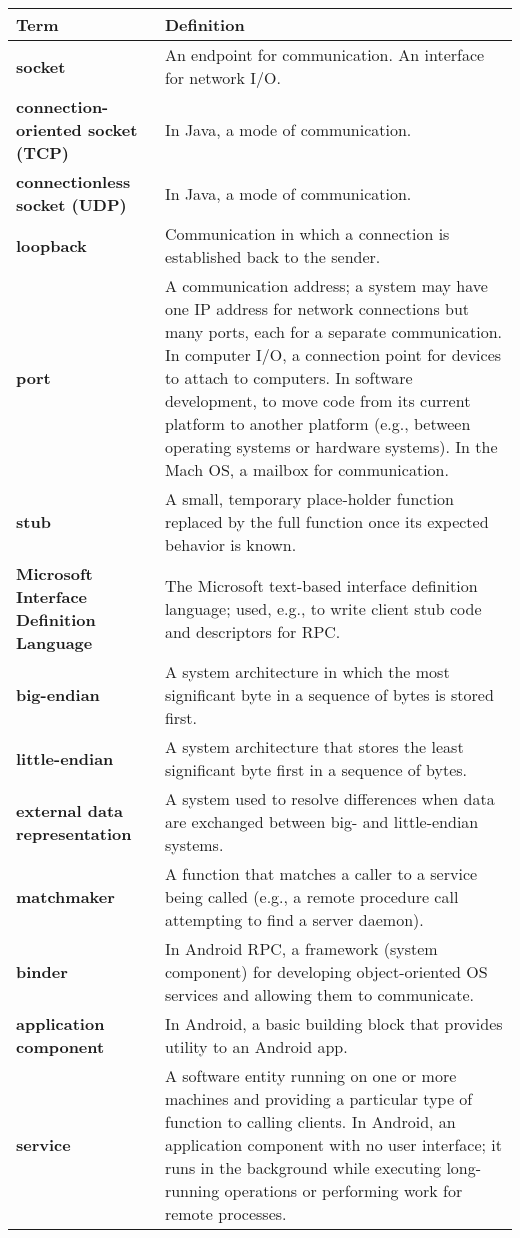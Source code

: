 \begin{tabular}{>{\raggedright}p{} >{\raggedright\arraybackslash}p{}}
\toprule
\textbf{Term} & \textbf{Definition} \\
\midrule
\textbf{socket} & An endpoint for communication. An interface for network I/O. \\
\textbf{connection-oriented socket (TCP)} & In Java, a mode of communication. \\
\textbf{connectionless socket (UDP)} & In Java, a mode of communication. \\
\textbf{loopback} & Communication in which a connection is established back to the sender. \\
\textbf{port} & A communication address; a system may have one IP address for network connections but many ports, each for a separate communication. In computer I/O, a connection point for devices to attach to computers. In software development, to move code from its current platform to another platform (e.g., between operating systems or hardware systems). In the Mach OS, a mailbox for communication. \\
\textbf{stub} & A small, temporary place-holder function replaced by the full function once its expected behavior is known. \\
\textbf{Microsoft Interface Definition Language} & The Microsoft text-based interface definition language; used, e.g., to write client stub code and descriptors for RPC. \\
\textbf{big-endian} & A system architecture in which the most significant byte in a sequence of bytes is stored first. \\
\textbf{little-endian} & A system architecture that stores the least significant byte first in a sequence of bytes. \\
\textbf{external data representation} & A system used to resolve differences when data are exchanged between big- and little-endian systems. \\
\textbf{matchmaker} & A function that matches a caller to a service being called (e.g., a remote procedure call attempting to find a server daemon). \\
\textbf{binder} & In Android RPC, a framework (system component) for developing object-oriented OS services and allowing them to communicate. \\
\textbf{application component} & In Android, a basic building block that provides utility to an Android app. \\
\textbf{service} & A software entity running on one or more machines and providing a particular type of function to calling clients. In Android, an application component with no user interface; it runs in the background while executing long-running operations or performing work for remote processes. \\
\bottomrule
\end{tabular}
\vspace{\baselineskip}
